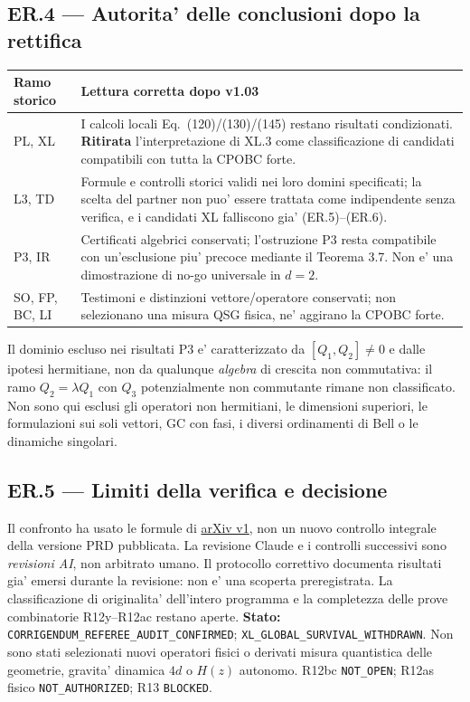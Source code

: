 \documentclass[11pt,a4paper]{article}
\begin{document}
\subsection*{ER.4 --- Autorita' delle conclusioni dopo la rettifica}
\begin{center}\small
\renewcommand{\arraystretch}{1.12}
\begin{tabular}{p{2.4cm}p{10.1cm}}
\toprule
Ramo storico & Lettura corretta dopo v1.03 \\ \midrule
PL, XL & I calcoli locali Eq.~(120)/(130)/(145) restano risultati
condizionati. \textbf{Ritirata} l'interpretazione di XL.3 come
classificazione di candidati compatibili con tutta la CPOBC forte.\\
L3, TD & Formule e controlli storici validi nei loro domini specificati;
la scelta del partner non puo' essere trattata come indipendente senza
verifica, e i candidati XL falliscono gia' (ER.5)--(ER.6).\\
P3, IR & Certificati algebrici conservati; l'ostruzione P3 resta
compatibile con un'esclusione piu' precoce mediante il Teorema 3.7.
Non e' una dimostrazione di no-go universale in $d=2$.\\
SO, FP, BC, LI & Testimoni e distinzioni vettore/operatore conservati;
non selezionano una misura QSG fisica, ne' aggirano la CPOBC forte.\\
\bottomrule
\end{tabular}
\end{center}
\noindent Il dominio escluso nei risultati P3 e' caratterizzato da
$[Q_1,Q_2]\ne0$ e dalle ipotesi hermitiane, non da qualunque
\emph{algebra} di crescita non commutativa: il ramo
$Q_2=\lambda Q_1$ con $Q_3$ potenzialmente non commutante rimane
non classificato. Non sono qui esclusi gli operatori non hermitiani,
le dimensioni superiori, le formulazioni sui soli vettori, GC con fasi,
i diversi ordinamenti di Bell o le dinamiche singolari.

\subsection*{ER.5 --- Limiti della verifica e decisione}
Il confronto ha usato le formule di \href{https://arxiv.org/html/2603.25503v1}{arXiv v1},
non un nuovo controllo integrale della versione PRD pubblicata.
La revisione Claude e i controlli successivi sono \emph{revisioni AI},
non arbitrato umano. Il protocollo correttivo documenta risultati
gia' emersi durante la revisione: non e' una scoperta preregistrata.
La classificazione di originalita' dell'intero programma e la
completezza delle prove combinatorie R12y--R12ac restano aperte.
\textbf{Stato:} \texttt{CORRIGENDUM\_REFEREE\_AUDIT\_CONFIRMED};
\texttt{XL\_GLOBAL\_SURVIVAL\_WITHDRAWN}. Non sono stati
selezionati nuovi operatori fisici o derivati misura quantistica delle
geometrie, gravita' dinamica $4d$ o $H(z)$ autonomo.
R12bc \texttt{NOT\_OPEN}; R12as fisico \texttt{NOT\_AUTHORIZED};
R13 \texttt{BLOCKED}.
\endgroup
\end{document}
